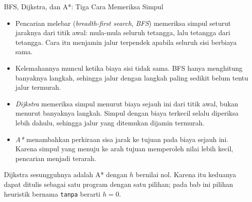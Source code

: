 \documentclass[aspectratio=169,10pt]{beamer}
\begin{document}
\begin{frame}{BFS, Dijkstra, dan A*: Tiga Cara Memeriksa Simpul}
\begin{itemize}
  \item Pencarian melebar (\emph{breadth-first search}, \emph{BFS}) memeriksa
        simpul seturut jaraknya dari titik awal: mula-mula seluruh tetangga,
        lalu tetangga dari tetangga. Cara itu menjamin jalur terpendek apabila
        seluruh sisi berbiaya sama.
  \item Kelemahannya muncul ketika biaya sisi tidak sama. BFS hanya menghitung
        banyaknya langkah, sehingga jalur dengan langkah paling sedikit belum
        tentu jalur termurah.
  \item \emph{Dijkstra} memeriksa simpul menurut biaya sejauh ini dari titik
        awal, bukan menurut banyaknya langkah. Simpul dengan biaya terkecil
        selalu diperiksa lebih dahulu, sehingga jalur yang ditemukan dijamin
        termurah.
  \item \emph{A*} menambahkan perkiraan sisa jarak ke tujuan pada biaya sejauh
        ini. Karena simpul yang menuju ke arah tujuan memperoleh nilai lebih
        kecil, pencarian menjadi terarah.
\end{itemize}
\vspace{0.12cm}
\begin{kotak}
Dijkstra sesungguhnya adalah A* dengan $h$ bernilai nol. Karena itu keduanya
dapat ditulis sebagai satu program dengan satu pilihan; pada bab ini pilihan
heuristik bernama \texttt{tanpa} berarti $h = 0$.
\end{kotak}
\end{frame}
\end{document}
